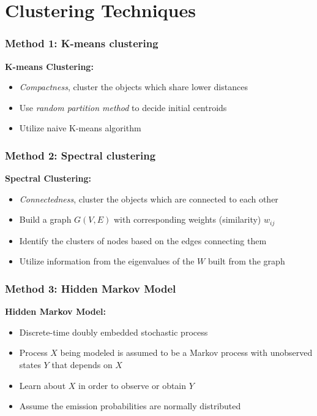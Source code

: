 \documentclass{beamer}
\begin{document}
\section{Clustering Techniques}

\begin{frame}
\frametitle{Method 1: K-means clustering}

\begin{description}
	\item[\textbf{K-means Clustering:}\hfill]
\end{description}

\begin{itemize}
	\item \textit{Compactness}, cluster the objects which share lower distances
	\item Use \textit{random partition method} to decide initial centroids
	\item Utilize naive K-means algorithm
\end{itemize}

\end{frame}



\begin{frame}
\frametitle{Method 2: Spectral clustering}
\begin{description}
	\item[\textbf{Spectral Clustering:}\hfill]
\end{description}

\begin{itemize}
	\item \textit{Connectedness}, cluster the objects which are connected to each other
	\item Build a graph $G(V, E)$ with corresponding weights (similarity) $w_{ij}$
	\item Identify the clusters of nodes based on the edges connecting them
	\item Utilize information from the eigenvalues of the $W$ built from the graph
\end{itemize}

\end{frame}


\begin{frame}
\frametitle{Method 3: Hidden Markov Model}
\begin{description}
	\item[\textbf{Hidden Markov Model:}\hfill]
\end{description}

\begin{itemize}
	\item Discrete-time doubly embedded stochastic process
	\item Process $X$ being modeled is assumed to be a Markov process with unobserved states $Y$ that depends on $X$
	\item Learn about $X$ in order to observe or obtain $Y$
	\item Assume the emission probabilities are normally distributed
\end{itemize}

\end{frame}
\end{document}
